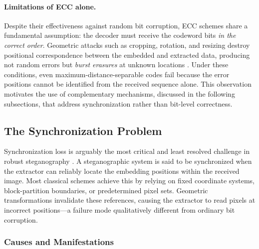 \documentclass[12pt,a4paper,oneside]{report}
\begin{document}
	\paragraph{Limitations of ECC alone.}
	Despite their effectiveness against random bit corruption, ECC schemes share a fundamental
	assumption: the decoder must receive the codeword bits \emph{in the correct order}.
	Geometric attacks such as cropping, rotation, and resizing destroy positional correspondence
	between the embedded and extracted data, producing not random errors but \emph{burst erasures}
	at unknown locations \cite{cox2007digital}.
	Under these conditions, even maximum-distance-separable codes fail because the error
	positions cannot be identified from the received sequence alone.
	This observation motivates the use of complementary mechanisms, discussed in the following
	subsections, that address synchronization rather than bit-level correctness.
	
	\subsection{The Synchronization Problem}
	\label{subsec:sync_problem}
	
	Synchronization loss is arguably the most critical and least resolved challenge in robust
	steganography \cite{ruanaidh1998rotation}.
	A steganographic system is said to be synchronized when the extractor can reliably locate
	the embedding positions within the received image.
	Most classical schemes achieve this by relying on fixed coordinate systems, block-partition
	boundaries, or predetermined pixel sets.
	Geometric transformations invalidate these references, causing the extractor to read pixels
	at incorrect positions—a failure mode qualitatively different from ordinary bit corruption.
	
	\subsubsection{Causes and Manifestations}
	
\end{document}
